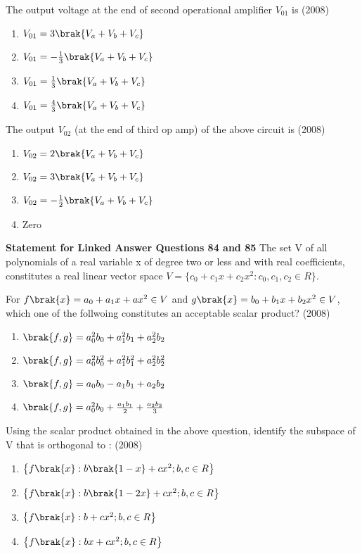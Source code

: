     \item The output voltage at the end of second operational amplifier $V_{01}$ is \hfill (2008)
    \begin{enumerate}[label=(\Alph*)]
        \item $V_{01}=3\brak{V_a+V_b+V_c}$
        \item $V_{01}=-\frac{1}{3}\brak{V_a+V_b+V_c}$
        \item $V_{01}=\frac{1}{3}\brak{V_a+V_b+V_c}$
        \item $V_{01}=\frac{4}{3}\brak{V_a+V_b+V_c}$
    \end{enumerate}
    \item The output $V_{02}$ (at the end of third op amp) of the above circuit is \hfill (2008)
    \begin{enumerate}[label=(\Alph*)]
        \item $V_{02}=2\brak{V_a+V_b+V_c}$
        \item $V_{02}=3\brak{V_a+V_b+V_c}$
        \item $V_{02}=-\frac{1}{2}\brak{V_a+V_b+V_c}$
        \item Zero
    \end{enumerate}
    \textbf{Statement for Linked Answer Questions 84 and 85}
    The set V of all polynomials of a real variable x of degree two or less and with real coefficients, constitutes a real linear vector space $V=\{c_0 + c_1x + c_2 x^2 : c_0, c_1, c_2 \in R\}$.
    \item  For $f \brak{x} = a_0 + a_1x + ax^2 \in V$ and $g\brak{x}=b_0+b_1x+b_2x^2 \in V$, which one of the follwoing constitutes an acceptable scalar product? \hfill (2008)
    \begin{enumerate}[label=(\Alph*)]
        \item $\brak{f,g} = a_0^2b_0+a_1^2b_1+a_2^2b_2$
        \item $\brak{f,g} = a_0^2b_0^2+a_1^2b_1^2+a_2^2b_2^2$
        \item $\brak{f,g} = a_0b_0-a_1b_1+a_2b_2$
        \item $\brak{f,g} = a_0^2b_0+\frac{a_1b_1}{2}+\frac{a_2b_2}{3}$
    \end{enumerate}
    \item Using the scalar product obtained in the above question, identify the subspace of V that is orthogonal to : \hfill (2008)
    \begin{enumerate}[label=(\Alph*)]
        \item $\bigl\{f\brak{x}:b\brak{1-x}+cx^2;b,c\in R\bigr\}$
        \item  $\bigl\{f\brak{x}:b\brak{1-2x}+cx^2;b,c\in R\bigr\}$
        \item  $\bigl\{f\brak{x}:b+cx^2;b,c\in R\bigr\}$
        \item  $\bigl\{f\brak{x}:bx+cx^2;b,c\in R\bigr\}$
    \end{enumerate}

